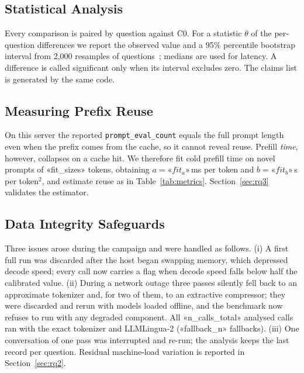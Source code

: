 \documentclass[journal]{IEEEtran}
\begin{document}
\subsection{Statistical Analysis}
Every comparison is paired by question against C0. For a statistic $\theta$ of the per-question differences we report the observed
value and a 95\% percentile bootstrap interval from 2,000 resamples of questions~\cite{efron1979bootstrap}; medians are used for
latency. A difference is called significant only when its interval excludes zero. The claims list is generated by the same code.

\subsection{Measuring Prefix Reuse}\label{sec:reuse}
On this server the reported \texttt{prompt\_eval\_count} equals the full prompt length even when the prefix comes from the cache,
so it cannot reveal reuse. Prefill \emph{time}, however, collapses on a cache hit. We therefore fit cold prefill time on novel
prompts of «fit_sizes» tokens, obtaining $a=«fit_a»$\,ms per token and $b=«fit_b»$\,\textmu s per token$^2$, and estimate reuse as in
Table~\ref{tab:metrics}. Section~\ref{sec:rq3} validates the estimator.

\subsection{Data Integrity Safeguards}
Three issues arose during the campaign and were handled as follows. (i) A first full run was discarded after the host began swapping
memory, which depressed decode speed; every call now carries a flag when decode speed falls below half the calibrated value.
(ii) During a network outage three passes silently fell back to an approximate tokenizer and, for two of them, to an extractive
compressor; they were discarded and rerun with models loaded offline, and the benchmark now refuses to run with any degraded
component. All «n_calls_total» analysed calls ran with the exact tokenizer and LLMLingua-2 («fallback_n» fallbacks). (iii) One
conversation of one pass was interrupted and re-run; the analysis keeps the last record per question. Residual machine-load
variation is reported in Section~\ref{sec:rq2}.

\end{document}
